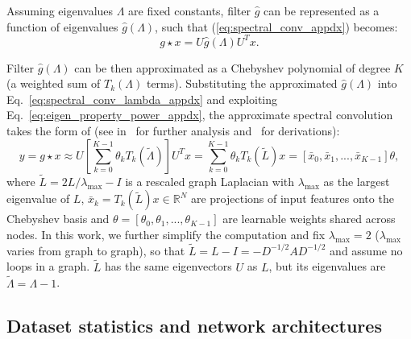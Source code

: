 \documentclass[final,nonatbib]{article} \usepackage{nips_2018}
\begin{document}
	Assuming eigenvalues $\Lambda$ are fixed constants, filter $\hat{g}$ can be represented as a function of eigenvalues $\hat{g}(\Lambda)$, such that (\ref{eq:spectral_conv_appdx}) becomes:
\begin{equation}
	\label{eq:spectral_conv_lambda_appdx}
	g \star x = U \hat{g}(\Lambda) U^T x.
	\end{equation}

	Filter $\hat{g}(\Lambda)$ can be then approximated as a Chebyshev polynomial of degree $K$ (a weighted sum of $T_k(\Lambda)$ terms).
	Substituting the approximated $\hat{g}(\Lambda)$ into Eq.~\ref{eq:spectral_conv_lambda_appdx} and exploiting Eq.~\ref{eq:eigen_property_power_appdx}, the approximate spectral convolution takes the form of (see in~\cite{defferrard2016convolutional, kipf2016semi} for further analysis and~\cite{hammond2011wavelets} for derivations):
\begin{equation}
	\label{eq:cheb_conv_appdx}
	y = g \star x \approx U \left[ \sum^{K-1}_{k=0} \theta_k T_k(\tilde{\Lambda}) \right] U^T x = \sum^{K-1}_{k=0} \theta_k T_k(\tilde{L}) x = [\bar{x}_0,\bar{x}_1,...,\bar{x}_{K-1}] \theta,
	\end{equation}
where $\tilde{L} = 2L/\lambda_{\max} - I$ is a rescaled graph Laplacian with $\lambda_{\max}$ as the largest eigenvalue of $L$, $\bar{x}_k=T_k(\tilde{L}) x \in \mathbb{R}^{N}$ are projections of input features onto the Chebyshev basis and $\theta=[\theta_0, \theta_1,...,\theta_{K-1}]$ are learnable weights shared across nodes.
	In this work, we further simplify the computation and fix $\lambda_{\max} = 2$ ($\lambda_{\max}$ varies from graph to graph), so that $\tilde{L} = L - I = - D^{-1/2}AD^{-1/2}$ and assume no loops in a graph. $\tilde{L}$ has the same eigenvectors $U$ as $L$, but its eigenvalues are $\tilde{\Lambda} = \Lambda - 1$.

	\subsection{Dataset statistics and network architectures}
\end{document}
